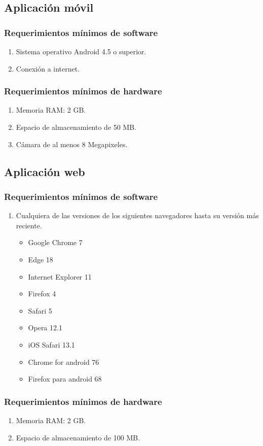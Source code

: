     \subsection{Aplicación móvil}
    \subsubsection{Requerimientos mínimos de software}
    \begin{enumerate}
        \item Sistema operativo Android 4.5 o superior.
        \item Conexión a internet.
    \end{enumerate}
    
    \subsubsection{Requerimientos mínimos de hardware}
    \begin{enumerate}
        \item Memoria RAM: 2 GB.
        \item Espacio de almacenamiento de 50 MB.
        \item Cámara de al menos 8 Megapixeles.
    \end{enumerate}
    \subsection{Aplicación web}
    \subsubsection{Requerimientos mínimos de software}
    \begin{enumerate}
        \item Cualquiera de las versiones de los siguientes navegadores hasta su versión más reciente.
        \begin{itemize}
            \item Google Chrome 7
            \item Edge 18
            \item Internet Explorer 11
            \item Firefox 4
            \item Safari 5
            \item Opera 12.1
            \item iOS Safari 13.1
            \item Chrome for android 76
            \item Firefox para android 68
        \end{itemize}
    \end{enumerate}
    \subsubsection{Requerimientos mínimos de hardware}
    \begin{enumerate}
        \item Memoria RAM: 2 GB.
        \item Espacio de almacenamiento de 100 MB.
    \end{enumerate}
